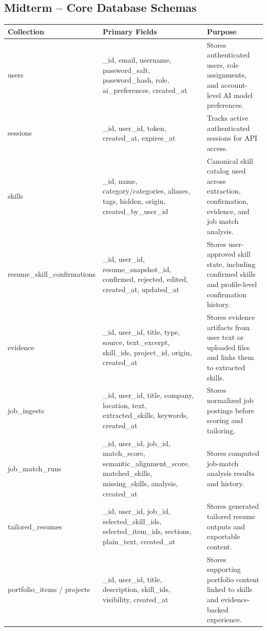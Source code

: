 \documentclass[11pt]{article}
\begin{document}
\subsection*{Midterm -- Core Database Schemas}

\begin{table}[H]
  \renewcommand{\arraystretch}{1.2}
  \begin{tabularx}{\linewidth}{@{}p{1.5in}Y Y@{}}
    \toprule
    \textbf{Collection} & \textbf{Primary Fields} & \textbf{Purpose} \\
    \midrule
    users & \_id, email, username, password\_salt, password\_hash, role, ai\_preferences, created\_at & Stores authenticated users, role assignments, and account-level AI model preferences. \\
    sessions & \_id, user\_id, token, created\_at, expires\_at & Tracks active authenticated sessions for API access. \\
    skills & \_id, name, category/categories, aliases, tags, hidden, origin, created\_by\_user\_id & Canonical skill catalog used across extraction, confirmation, evidence, and job match analysis. \\
    resume\_skill\_confirmations & \_id, user\_id, resume\_snapshot\_id, confirmed, rejected, edited, created\_at, updated\_at & Stores user-approved skill state, including confirmed skills and profile-level confirmation history. \\
    evidence & \_id, user\_id, title, type, source, text\_excerpt, skill\_ids, project\_id, origin, created\_at & Stores evidence artifacts from user text or uploaded files and links them to extracted skills. \\
    job\_ingests & \_id, user\_id, title, company, location, text, extracted\_skills, keywords, created\_at & Stores normalized job postings before scoring and tailoring. \\
    job\_match\_runs & \_id, user\_id, job\_id, match\_score, semantic\_alignment\_score, matched\_skills, missing\_skills, analysis, created\_at & Stores computed job-match analysis results and history. \\
    tailored\_resumes & \_id, user\_id, job\_id, selected\_skill\_ids, selected\_item\_ids, sections, plain\_text, created\_at & Stores generated tailored resume outputs and exportable content. \\
    portfolio\_items / projects & \_id, user\_id, title, description, skill\_ids, visibility, created\_at & Stores supporting portfolio content linked to skills and evidence-backed experience. \\
    \bottomrule
  \end{tabularx}
\end{table}
\end{document}
